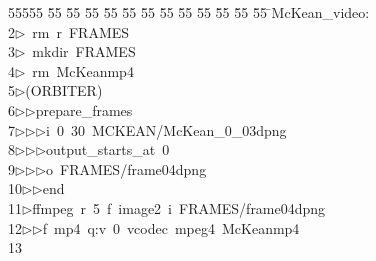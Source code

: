 %
%
\begin{tabbing}
55555 \= 55 \= 55 \= 55 \= 55 \= 55 \= 55 \= 55 \= 55 \= 55 \= 55 \= 55 \= 55 \= \>McKean\_video:\\[0pt]
2\>$\triangleright$\>\ rm\ r\ FRAMES\\[0pt]
3\>$\triangleright$\>\ mkdir\ FRAMES\\[0pt]
4\>$\triangleright$\>\ rm\ McKeanmp4\\[0pt]
5\>$\triangleright$\>(ORBITER)\ \\[0pt]
6\>$\triangleright$\>$\triangleright$\>prepare\_frames\ \\[0pt]
7\>$\triangleright$\>$\triangleright$\>$\triangleright$\>i\ 0\ 30\ MCKEAN/McKean\_0\_03dpng\ \\[0pt]
8\>$\triangleright$\>$\triangleright$\>$\triangleright$\>output\_starts\_at\ 0\ \\[0pt]
9\>$\triangleright$\>$\triangleright$\>$\triangleright$\>o\ FRAMES/frame04dpng\ \\[0pt]
10\>$\triangleright$\>$\triangleright$\>end\\[0pt]
11\>$\triangleright$\>ffmpeg\ r\ 5\ f\ image2\ i\ FRAMES/frame04dpng\ \\[0pt]
12\>$\triangleright$\>$\triangleright$\>f\ mp4\ q:v\ 0\ vcodec\ mpeg4\ McKeanmp4\\[0pt]
13\>\end{tabbing}
